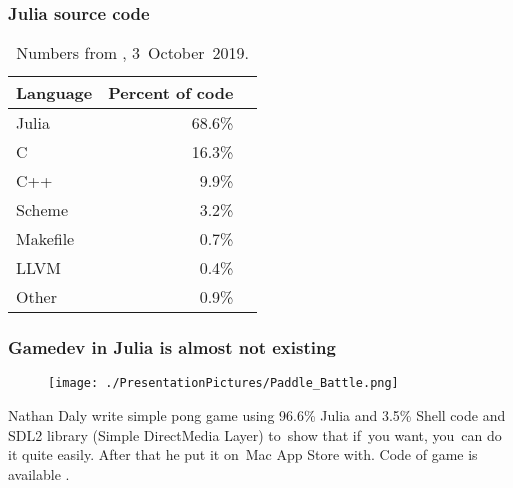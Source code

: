 \documentclass[10pt,t]{beamer}
\begin{document}
\begin{frame}
  \frametitle{Julia source code}


  \begin{table}
    \centering

      \begin{tabular}{|l|r|r|}
        \hline
        Language & Percent of code \\
        \hline
        Julia & 68.6\% \\
        \hline
        C & 16.3\% \\
        \hline
        C++ & 9.9\% \\
        \hline
        Scheme & 3.2\% \\
        \hline
        Makefile & 0.7\% \\
        \hline
        LLVM & 0.4\% \\
        \hline
        Other & 0.9\% \\
        \hline
      \end{tabular}

      \caption{Numbers from ,
        3~October~2019.}

    \end{table}

\end{frame}





\begin{frame}
  \frametitle{Gamedev in Julia is almost not existing}


  \begin{figure}

    \centering

    \texttt{[image: ./PresentationPictures/Paddle\_Battle.png]}

  \end{figure}

  Nathan Daly write simple pong game using 96.6\% Julia and 3.5\%
  Shell code and SDL2 library (Simple DirectMedia Layer) to~show that
  if~you want, you~can do it quite easily. After that he put it on~Mac
  App Store with. Code of game is available
  .

\end{frame}
\end{document}
